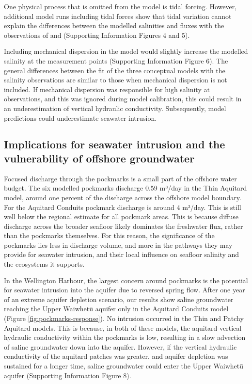 \documentclass[draft, 10pt]{agujournal2019}
\begin{document}
One physical process that is omitted from the model is tidal forcing.
However, additional model runs including tidal forces show that tidal variation cannot explain the differences between the modelled salinities and fluxes with the observations of  and  (Supporting Information Figures 4 and 5).

Including mechanical dispersion in the model would slightly increase the modelled salinity at the measurement points (Supporting Information Figure 6).
The general differences between the fit of the three conceptual models with the salinity observations are similar to those when mechanical dispersion is not included.
If mechanical dispersion was responsible for high salinity at observations, and this was ignored during model calibration,
this could result in an underestimation of vertical hydraulic conductivity. Subsequently, model predictions could underestimate seawater intrusion.

\subsection{Implications for seawater intrusion and the vulnerability of offshore groundwater}

Focused discharge through the pockmarks is a small part of the offshore water budget.
The six modelled pockmarks discharge 0.59 m³/day in the Thin Aquitard model, around one percent of the discharge across the offshore model boundary.
For the Aquitard Conduits pockmark discharge is around 4 m³/day.
This is still well below the regional estimate for all pockmark areas.
This is because diffuse discharge across the broader seafloor likely dominates the freshwater flux, rather than the pockmarks themselves.
For this reason, the significance of the pockmarks lies less in discharge volume, and more in the pathways they may provide for seawater intrusion, and their local influence on seafloor salinity and the ecosystems it supports.

In the Wellington Harbour, the largest concern around pockmarks is the potential for seawater intrusion into the aquifer due to reversed spring flow.
After one year of an extreme aquifer depletion scenario, our results show saline groundwater reaching the Upper Waiwhetū aquifer only in the Aquitard Conduits model (Figure \ref{fig:pockmarks-response}).
No intrusion occurred in the Thin and Patchy Aquitard models.
This is because, in both of these models, the aquitard vertical hydraulic conductivity within the pockmarks is low,
resulting in a slow advection of saline groundwater down into the aquifer.
However, if the vertical hydraulic conductivity of the aquitard patches was greater, and aquifer depletion was sustained for a longer time, saline groundwater could enter the Upper Waiwhetū aquifer (Supporting Information Figure 8).
\end{document}
